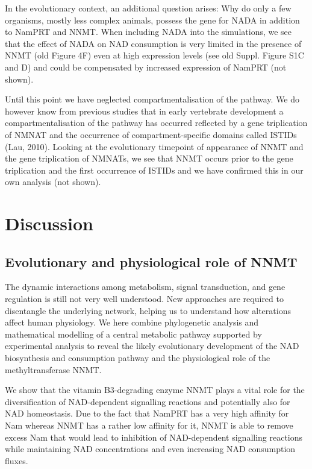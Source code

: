\documentclass[paper=a4, 12pt]{scrartcl}
\begin{document}
In the evolutionary context, an additional question arises: Why do only a few organisms, mostly less complex animals, possess the gene for NADA in addition to NamPRT and NNMT. When including NADA into the simulations, we see that the effect of NADA on NAD consumption is very limited in the presence of NNMT (old Figure 4F) even at high expression levels (see old Suppl. Figure S1C and D) and could be compensated by increased expression of NamPRT (not shown).

Until this point we have neglected compartmentalisation of the pathway. We do however know from previous studies that in early vertebrate development a compartmentalisation of the pathway has occurred reflected by a gene triplication of NMNAT and the occurrence of compartment-specific domains called ISTIDs (Lau, 2010). Looking at the evolutionary timepoint  of appearance of NNMT and the gene triplication of NMNATs, we see that NNMT occurs prior to the gene triplication and the first occurrence of ISTIDs and we have confirmed this in our own analysis (not shown).


\section{Discussion}

\subsection{Evolutionary and physiological role of NNMT}

The dynamic interactions among metabolism, signal transduction, and gene regulation is still not very well understood. New approaches are required to disentangle the underlying network, helping us to understand how alterations affect human physiology. We here combine phylogenetic analysis and mathematical modelling of a central metabolic pathway supported by experimental analysis to reveal the likely evolutionary development of the NAD biosynthesis and consumption pathway and the physiological role of the methyltransferase NNMT.

We show that the vitamin B3-degrading enzyme NNMT plays a vital role for the diversification of NAD-dependent signalling reactions and potentially also for NAD homeostasis. Due to the fact that NamPRT has a very high affinity for Nam whereas NNMT has a rather low affinity for it, NNMT is able to remove excess Nam that would lead to inhibition of NAD-dependent signalling reactions while maintaining NAD concentrations and even increasing NAD consumption fluxes.
\end{document}
